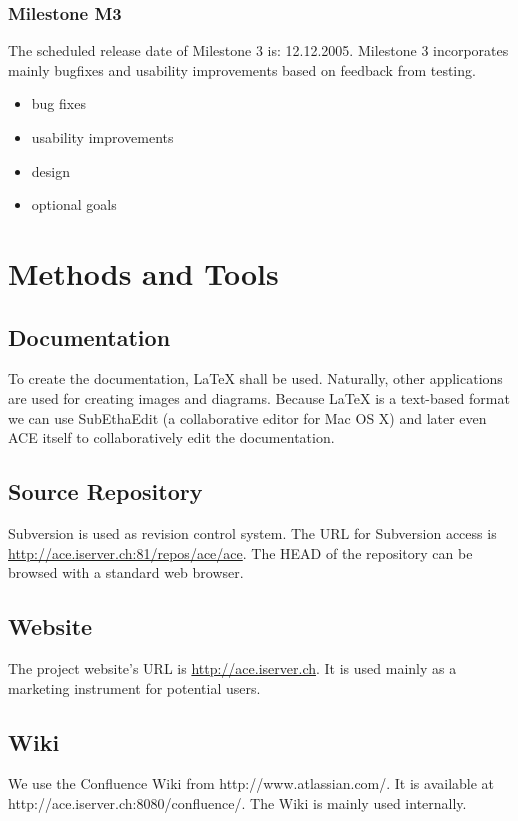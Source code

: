 \documentclass[11pt,a4paper]{article}
\begin{document}
\subsubsection{Milestone M3}

The scheduled release date of Milestone 3 is: 12.12.2005. Milestone 3 incorporates mainly bugfixes and
usability improvements based on feedback from testing.

\begin{itemize}
 \item bug fixes
 \item usability improvements
 \item design
 \item optional goals
\end{itemize}


\section{Methods and Tools}

\subsection{Documentation}
To create the documentation, \LaTeX{} shall be used. Naturally, other applications are used for creating images and diagrams.
Because \LaTeX{} is a text-based format we can use SubEthaEdit (a collaborative editor for Mac OS X) and later even
ACE itself to collaboratively edit the documentation. 

\subsection{Source Repository}
Subversion is used as revision control system. The URL for Subversion access is
\href{http://ace.iserver.ch:81/repos/ace/ace}{http://ace.iserver.ch:81/repos/ace/ace}. The HEAD of the repository can
be browsed with a standard web browser.

\subsection{Website}
The project website's URL is \href{http://ace.iserver.ch}{http://ace.iserver.ch}. It is used mainly as a marketing instrument
for potential users. 

\subsection{Wiki}
We use the Confluence Wiki from http://www.atlassian.com/. It is available
at http://ace.iserver.ch:8080/confluence/. The Wiki is mainly used internally.
\end{document}
